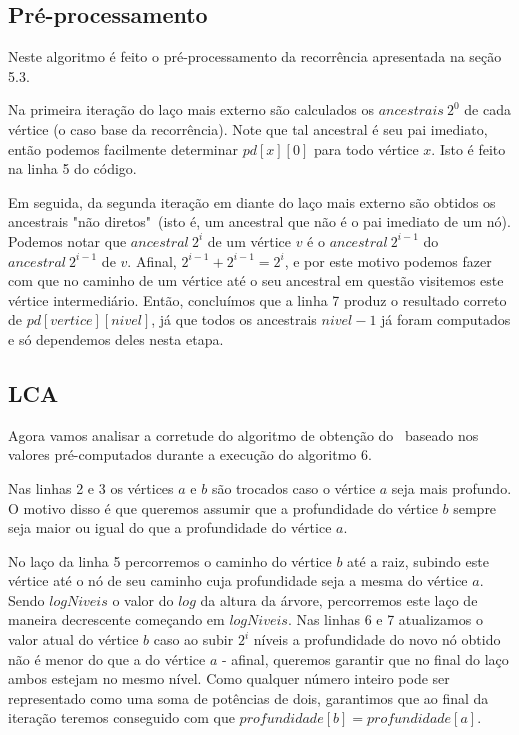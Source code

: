 \subsection{Pré-processamento}

Neste algoritmo é feito o pré-processamento da recorrência apresentada na seção 5.3.

Na primeira iteração do laço mais externo são calculados os $ancestrais\ 2^0$ de cada vértice (o caso base da recorrência). Note que tal ancestral é seu pai imediato, então podemos facilmente determinar $pd[x][0]$ para todo vértice $x$. Isto é feito na linha 5 do código.

Em seguida, da segunda iteração em diante do laço mais externo são obtidos os ancestrais "não diretos"\ (isto é, um ancestral que não é o pai imediato de um nó). Podemos notar que $ancestral\ 2^i$ de um vértice $v$ é o $ancestral\ 2^{i-1}$ do $ancestral\ 2^{i-1}$ de $v$. Afinal, $2^{i-1} + 2^{i-1} = 2^i$, e por este motivo podemos fazer com que no caminho de um vértice até o seu ancestral em questão visitemos este vértice intermediário. Então, concluímos que a linha 7 produz o resultado correto de $pd[vertice][nivel]$, já que todos os ancestrais $nivel - 1$ já foram computados e só dependemos deles nesta etapa.


\subsection{LCA}

Agora vamos analisar a corretude do algoritmo de obtenção do \LCA\ baseado nos valores pré-computados durante a execução do algoritmo 6.

Nas linhas 2 e 3 os vértices $a$ e $b$ são trocados caso o vértice $a$ seja mais profundo. O motivo disso é que queremos assumir que a profundidade do vértice $b$ sempre seja maior ou igual do que a profundidade do vértice $a$.

No laço da linha 5 percorremos o caminho do vértice $b$ até a raiz, subindo este vértice até o nó de seu caminho cuja profundidade seja a mesma do vértice $a$. Sendo $logNiveis$ o valor do $log$ da altura da árvore, percorremos este laço de maneira decrescente começando em $logNiveis$. Nas linhas 6 e 7 atualizamos o valor atual do vértice $b$ caso ao subir $2^i$ níveis a profundidade do novo nó obtido não é menor do que a do vértice $a$ - afinal, queremos garantir que no final do laço ambos estejam no mesmo nível. Como qualquer número inteiro pode ser representado como uma soma de potências de dois, garantimos que ao final da iteração teremos conseguido com que $profundidade[b] = profundidade[a]$.


